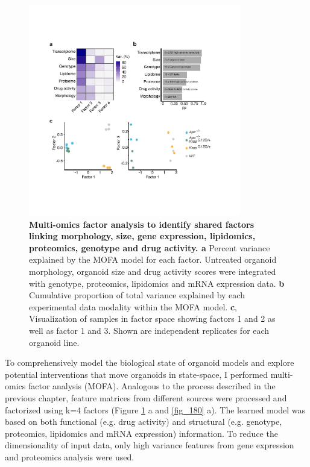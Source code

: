 \begin{flushleft}
\begin{figure}[h!]
\centering
\includegraphics[width=350,
                height=\textheight,
                keepaspectratio]{figures/adenomaprofiling/pdf/fig_1_7.pdf}
\caption{\textbf{Multi-omics factor analysis to identify shared factors linking morphology, size, gene expression, lipidomics, proteomics, genotype and drug activity. a} Percent variance explained by the MOFA model for each factor. Untreated organoid morphology, organoid size and drug activity scores were integrated with genotype, proteomics, lipidomics and mRNA expression data. \textbf{b} Cumulative proportion of total variance explained by each experimental data modality within the MOFA model. \textbf{c}, Visualization of samples in factor space showing factors 1 and 2 as well as factor 1 and 3. Shown are independent replicates for each organoid line. 
}
\label{fig_170}
\end{figure}
\bigbreak

To comprehensively model the biological state of organoid models and explore potential interventions that move organoids in state-space, I performed multi-omics factor analysis (MOFA). Analogous to the process described in the previous chapter, feature matrices from different sources were processed and factorized using k=4 factors (Figure \ref{fig_170} a and \ref{fig_180} a). The learned model was based on both functional (e.g. drug activity) and structural (e.g. genotype, proteomics, lipidomics and mRNA expression) information. To reduce the dimensionality of input data, only high variance features from gene expression and proteomics analysis were used.


\end{flushleft}
